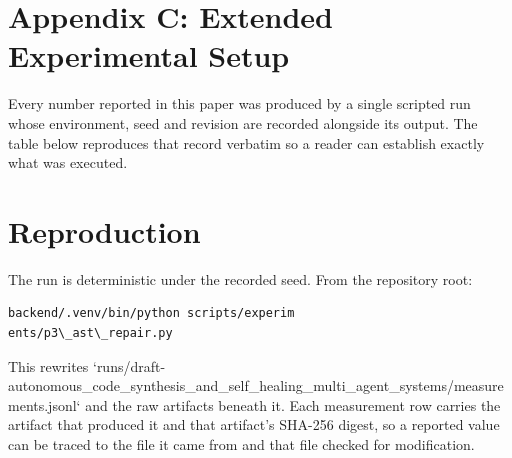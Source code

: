 \documentclass[10pt,twocolumn,letterpaper]{article}
\begin{document}
\section{Appendix C: Extended Experimental Setup}


Every number reported in this paper was produced by a single scripted run whose environment, seed and revision are recorded alongside its output. The table below reproduces that record verbatim so a reader can establish exactly what was executed.
\begin{table}[htbp]
\centering
{}
\end{table}


\section{Reproduction}


The run is deterministic under the recorded seed. From the repository root:


\begin{scriptsize}
\begin{verbatim}
backend/.venv/bin/python scripts/experim
ents/p3\_ast\_repair.py
\end{verbatim}
\end{scriptsize}


This rewrites `runs/draft-autonomous\_code\_synthesis\_and\_self\_healing\_multi\_agent\_systems/measurements.jsonl` and the raw artifacts beneath it. Each measurement row carries the artifact that produced it and that artifact's SHA-256 digest, so a reported value can be traced to the file it came from and that file checked for modification.
\end{document}
